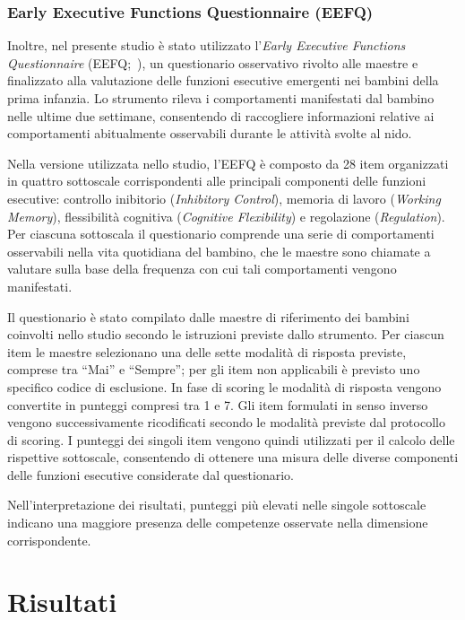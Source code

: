  \subsubsection{Early Executive Functions Questionnaire (EEFQ)}
 \label{sec:4_2_3_4}

Inoltre, nel presente studio è stato utilizzato l'\emph{Early Executive Functions Questionnaire} (EEFQ;~\cite{hendry2021}), un questionario osservativo rivolto alle maestre e finalizzato alla valutazione delle funzioni esecutive emergenti nei bambini della prima infanzia. Lo strumento rileva i comportamenti manifestati dal bambino nelle ultime due settimane, consentendo di raccogliere informazioni relative ai comportamenti abitualmente osservabili durante le attività svolte al nido.

Nella versione utilizzata nello studio, l'EEFQ è composto da 28 item organizzati in quattro sottoscale corrispondenti alle principali componenti delle funzioni esecutive: controllo inibitorio (\emph{Inhibitory Control}), memoria di lavoro (\emph{Working Memory}), flessibilità cognitiva (\emph{Cognitive Flexibility}) e regolazione (\emph{Regulation}). Per ciascuna sottoscala il questionario comprende una serie di comportamenti osservabili nella vita quotidiana del bambino, che le maestre sono chiamate a valutare sulla base della frequenza con cui tali comportamenti vengono manifestati.

Il questionario è stato compilato dalle maestre di riferimento dei bambini coinvolti nello studio secondo le istruzioni previste dallo strumento. Per ciascun item le maestre selezionano una delle sette modalità di risposta previste, comprese tra ``Mai'' e ``Sempre''; per gli item non applicabili è previsto uno specifico codice di esclusione. In fase di scoring le modalità di risposta vengono convertite in punteggi compresi tra 1 e 7. Gli item formulati in senso inverso vengono successivamente ricodificati secondo le modalità previste dal protocollo di scoring. I punteggi dei singoli item vengono quindi utilizzati per il calcolo delle rispettive sottoscale, consentendo di ottenere una misura delle diverse componenti delle funzioni esecutive considerate dal questionario.

Nell'interpretazione dei risultati, punteggi più elevati nelle singole sottoscale indicano una maggiore presenza delle competenze osservate nella dimensione corrispondente.

 \section{Risultati}
 \label{sec:4_3}

